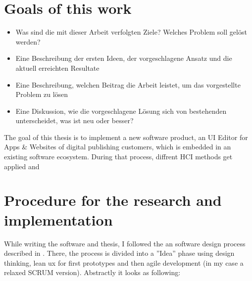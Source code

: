 \section{Goals of this work}
\begin{itemize}
	\item Was sind die mit dieser Arbeit verfolgten Ziele? Welches Problem soll gelöst werden?
	\item Eine Beschreibung der ersten Ideen, der vorgeschlagene Ansatz und die aktuell erreichten Resultate 
	\item Eine Beschreibung, welchen Beitrag die Arbeit leistet, um das vorgestellte Problem zu lösen
	\item Eine Diskussion, wie die vorgeschlagene Lösung sich von bestehenden unterscheidet, was ist neu oder besser?
\end{itemize}

The goal of this thesis is to implement a new software product, an UI Editor for Apps \& Websites of digital publishing customers,
which is embedded in an existing software ecosystem. During that process, diffrent HCI methods get applied and  

\section{Procedure for the research and implementation}

While writing the software and thesis, I followed the an software design process described in \cite[p. 104]{LearnHCI:2020ys}.
There, the process is divided into a ''Idea'' phase using design thinking, lean ux for first prototypes and then agile development (in my case a relaxed SCRUM version).
Abstractly it looks as following:

